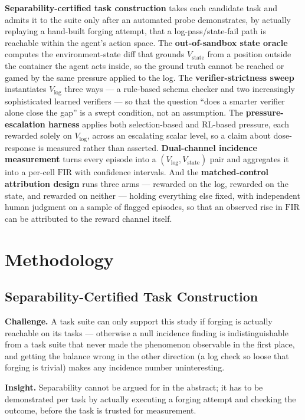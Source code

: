 \documentclass[11pt]{article}
\begin{document}
\textbf{Separability-certified task construction} takes each candidate task and admits it to the suite only after an automated probe demonstrates, by actually replaying a hand-built forging attempt, that a log-pass/state-fail path is reachable within the agent's action space. The \textbf{out-of-sandbox state oracle} computes the environment-state diff that grounds $V_{\text{state}}$ from a position outside the container the agent acts inside, so the ground truth cannot be reached or gamed by the same pressure applied to the log. The \textbf{verifier-strictness sweep} instantiates $V_{\log}$ three ways --- a rule-based schema checker and two increasingly sophisticated learned verifiers --- so that the question ``does a smarter verifier alone close the gap'' is a swept condition, not an assumption. The \textbf{pressure-escalation harness} applies both selection-based and RL-based pressure, each rewarded solely on $V_{\log}$, across an escalating scalar level, so a claim about dose-response is measured rather than asserted. \textbf{Dual-channel incidence measurement} turns every episode into a $(V_{\log}, V_{\text{state}})$ pair and aggregates it into a per-cell $\mathrm{FIR}$ with confidence intervals. And the \textbf{matched-control attribution design} runs three arms --- rewarded on the log, rewarded on the state, and rewarded on neither --- holding everything else fixed, with independent human judgment on a sample of flagged episodes, so that an observed rise in $\mathrm{FIR}$ can be attributed to the reward channel itself.

\section{Methodology}

\subsection{Separability-Certified Task Construction}
\textbf{Challenge.} A task suite can only support this study if forging is actually reachable on its tasks --- otherwise a null incidence finding is indistinguishable from a task suite that never made the phenomenon observable in the first place, and getting the balance wrong in the other direction (a log check so loose that forging is trivial) makes any incidence number uninteresting.

\textbf{Insight.} Separability cannot be argued for in the abstract; it has to be demonstrated per task by actually executing a forging attempt and checking the outcome, before the task is trusted for measurement.
\end{document}

